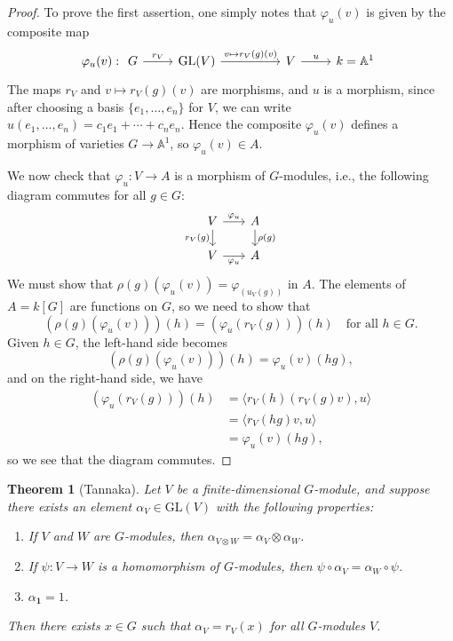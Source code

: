 \documentclass[10pt]{amsart}
\numberwithin{equation}{section}
\newcommand{\vp}{\varphi}
\newcommand{\A}{\mathbb{A}}
\newcommand{\GL}{\mathrm{GL}}
\theoremstyle{plain}
\newtheorem{thm}{Theorem}[section]
\theoremstyle{definition}
\theoremstyle{remark}
\begin{document}
\begin{proof}
    To prove the first assertion, one simply notes that $\vp_u(v)$ is given by the composite map
    \[\vp_u(v): \begin{tikzcd}
    G & {\GL(V)} && V & {k = \A^1}
    \arrow["{r_V}", from=1-1, to=1-2]
    \arrow["{v \mapsto r_V(g)(v)}", from=1-2, to=1-4]
    \arrow["u", from=1-4, to=1-5]
\end{tikzcd}\]
The maps $r_V$ and $v \mapsto r_V(g)(v)$ are morphisms, and $u$ is a morphism, since after choosing a basis $\{e_1, \hdots, e_n\}$ for $V$, we can write $u(e_1, \hdots, e_n) = c_1e_1 + \cdots + c_n e_n$. Hence the composite $\vp_u(v)$ defines a morphism of varieties $G \to \A^1$, so $\vp_u(v) \in A$. 

We now check that $\vp_u: V \to A$ is a morphism of $G$-modules, i.e., the following diagram commutes for all $g \in G$:
\[\begin{tikzcd}[sep=scriptsize]
    V & A \\
    V & A
    \arrow["\vp_u", from=1-1, to=1-2]
    \arrow["{r_V(g)}"', from=1-1, to=2-1]
    \arrow["{\rho(g)}", from=1-2, to=2-2]
    \arrow["\vp_u"', from=2-1, to=2-2]
\end{tikzcd}\]
We must show that $\rho(g)(\vp_u(v)) = \vp_(u_V(g))$ in $A$. The elements of $A = k[G]$ are functions on $G$, so we need to show that
\[\left(\rho(g)(\vp_u(v)) \right)(h) = \left(\vp_u(r_V(g))\right)(h) \quad \text{for all } h \in G.\]
Given $h \in G$, the left-hand side becomes
\[\left(\rho(g)(\vp_u(v)) \right)(h) = \vp_u(v)(hg),\]
and on the right-hand side, we have
\begin{align*}
    \left(\vp_u(r_V(g))\right)(h) &= \langle r_V(h)(r_V(g)v), u \rangle \\ 
                                  &= \langle r_V(hg)v, u \rangle \\ 
                                  &= \vp_u(v)(hg),
\end{align*}
so we see that the diagram commutes.
\end{proof}

\begin{thm}[Tannaka]\label{thm:1}
    Let $V$ be a finite-dimensional $G$-module, and suppose there exists an element $\alpha_V \in \GL(V)$ with the following properties:
    \begin{enumerate}
        \item \label{T1} If $V$ and $W$ are $G$-modules, then $\alpha_{V \otimes W} = \alpha_V \otimes \alpha_W$.
        \item \label{T2} If $\psi: V \to W$ is a homomorphism of $G$-modules, then $\psi \circ \alpha_V = \alpha_W \circ \psi$.
        \item \label{T3} $\alpha_{\mathbf{1}} = 1$.
    \end{enumerate} 
    Then there exists $x \in G$ such that $\alpha_V = r_V(x)$ for all $G$-modules $V$.
\end{thm}
\end{document}
